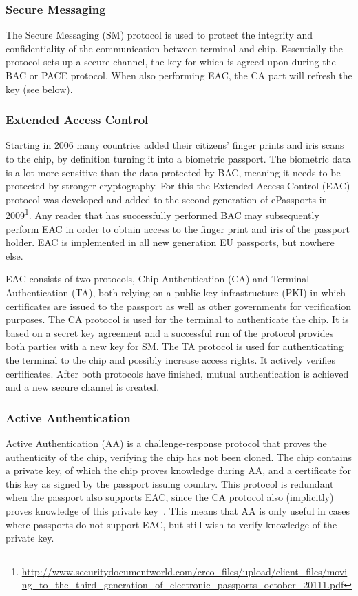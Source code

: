 \subsubsection{Secure Messaging}
The Secure Messaging (SM) protocol is used to protect the integrity and confidentiality of the communication between terminal and chip. Essentially the protocol sets up a secure channel, the key for which is agreed upon during the BAC or PACE protocol. When also performing EAC, the CA part will refresh the key (see below).

\subsubsection{Extended Access Control}
Starting in 2006 many countries added their citizens' finger prints and iris scans to the chip, by definition turning it into a biometric passport. The biometric data is a lot more sensitive than the data protected by BAC, meaning it needs to be protected by stronger cryptography. For this the Extended Access Control (EAC) protocol was developed and added to the second generation of ePassports in 2009\footnote{\url{http://www.securitydocumentworld.com/creo_files/upload/client_files/moving_to_the_third_generation_of_electronic_passports_october_20111.pdf}}. Any reader that has successfully performed BAC may subsequently perform EAC in order to obtain access to the finger print and iris of the passport holder. EAC is implemented in all new generation EU passports, but nowhere else.

EAC consists of two protocols, Chip Authentication (CA) and Terminal Authentication (TA), both relying on a public key infrastructure (PKI) in which certificates are issued to the passport as well as other governments for verification purposes. The CA protocol is used for the terminal to authenticate the chip. It is based on a secret key agreement and a successful run of the protocol provides both parties with a new key for SM. The TA protocol is used for authenticating the terminal to the chip and possibly increase access rights. It actively verifies certificates. After both protocols have finished, mutual authentication is achieved and a new secure channel is created.

\subsubsection{Active Authentication}
Active Authentication (AA) is a challenge-response protocol that proves the authenticity of the chip, verifying the chip has not been cloned. The chip contains a private key, of which the chip proves knowledge during AA, and a certificate for this key as signed by the passport issuing country. This protocol is redundant when the passport also supports EAC, since the CA protocol also (implicitly) proves knowledge of this private key~\cite{secprivepassport}. This means that AA is only useful in cases where passports do not support EAC, but still wish to verify knowledge of the private key.

